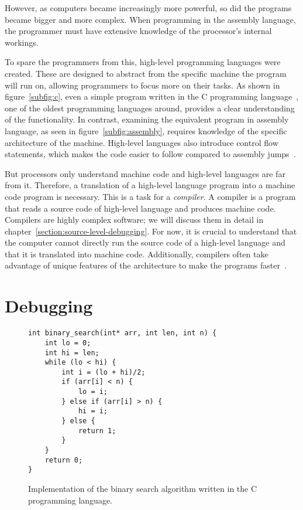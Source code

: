 However, as computers became increasingly more powerful, so did the programs
became bigger and more complex. When programming in the assembly language, the
programmer must have extensive knowledge of the processor's internal workings.

To spare the programmers from this, high-level programming languages were
created. These are designed to abstract from the specific machine the program
will run on, allowing programmers to focus more on their tasks. As shown in
figure~\ref{subfig:c}, even a simple program written in the C programming
language~\cite{krc}, one of the oldest programming languages around, provides a
clear understanding of the functionality. In contrast, examining the equivalent
program in assembly language, as seen in figure~\ref{subfig:assembly}, requires
knowledge of the specific architecture of the machine. High-level languages
also introduce control flow statements, which makes the code easier to follow
compared to assembly jumps~\cite{gotobad}.

But processors only understand machine code and high-level languages are far
from it. Therefore, a translation of a high-level language program into a
machine code program is necessary. This is a task for a \textit{compiler}. A
compiler is a program that reads a source code of high-level language and
produces machine code. Compilers are highly complex software; we will discuss
them in detail in chapter~\ref{section:source-level-debugging}. For now, it is
crucial to understand that the computer cannot directly run the source code of
a high-level language and that it is translated into machine code.
Additionally, compilers often take advantage of unique features of the
architecture to make the programs faster~\cite{dragon-book}.

\section{Debugging}
\begin{figure}
    \begin{verbatim}
int binary_search(int* arr, int len, int n) {
    int lo = 0;
    int hi = len;
    while (lo < hi) {
        int i = (lo + hi)/2;
        if (arr[i] < n) {
            lo = i;
        } else if (arr[i] > n) {
            hi = i;
        } else {
            return 1;
        }
    }
    return 0;
}
    \end{verbatim}
    \caption{Implementation of the binary search algorithm written in the C
    programming language.}
    \label{fig:binary-search}
\end{figure}

